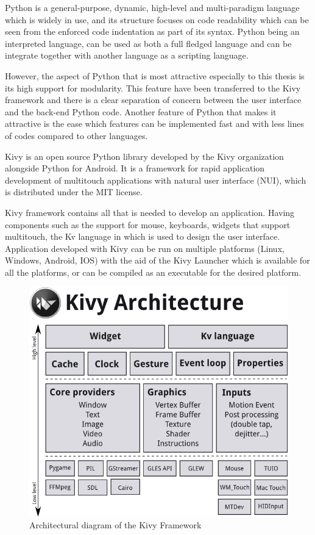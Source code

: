 Python is a general-purpose, dynamic, high-level and multi-paradigm language which is widely in use, and its structure focuses on code readability which can be seen from the enforced code indentation as part of its syntax. Python being an interpreted language, can be used as both a full fledged language and can be integrate together with another language as a scripting language.

However, the aspect of Python that is most attractive especially to this thesis is its high support for modularity. This feature have been transferred to the Kivy framework and there is a clear separation of concern between the user interface and the back-end Python code. Another feature of Python that makes it attractive is the ease which features can be implemented fast and with less lines of codes compared to other languages.   

Kivy is an open source Python library developed by the Kivy organization alongside Python for Android. It is a framework for rapid application development of multitouch applications with natural user interface (NUI), which is distributed under the MIT license.

Kivy framework contains all that is needed to develop an application. Having components such as the support for mouse, keyboards, widgets that support multitouch, the Kv language in which is used to design the user interface. Application developed with Kivy can be run on multiple platforms (Linux, Windows, Android, IOS) with the aid of the Kivy Launcher which is available for all the platforms, or can be compiled as an executable for the desired platform. 

\begin{figure}[ht!]
\centering
\includegraphics[width=120mm]{kivy_architecture.png}
\caption{Architectural diagram of the Kivy Framework}
\label{overflow}
\end{figure}

